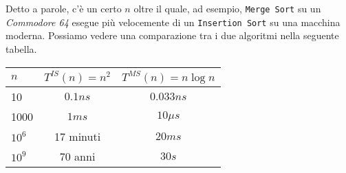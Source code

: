 Detto a parole, c'è un certo $n$ oltre il quale, ad esempio, \texttt{Merge Sort} su un \emph{Commodore 64} 
esegue più velocemente di un \texttt{Insertion Sort} su una macchina moderna. Possiamo vedere una comparazione tra i due algoritmi nella seguente tabella.
\begin{center}
	\begin{tabular}{l|c|c}
		$n$ & $T^{IS}(n)=n^2$ & $T^{MS}(n)=n \log n$ \\
		\hline
		10 & $0.1ns$ & $0.033ns$ \\
		\hline
		1000 & $1ms$ & $10\mu s$ \\
		\hline
		$10^6$ & 17 minuti & $20ms$ \\
		\hline
		$10^9$ & 70 anni & $30s$ \\
	\end{tabular}
\end{center}
